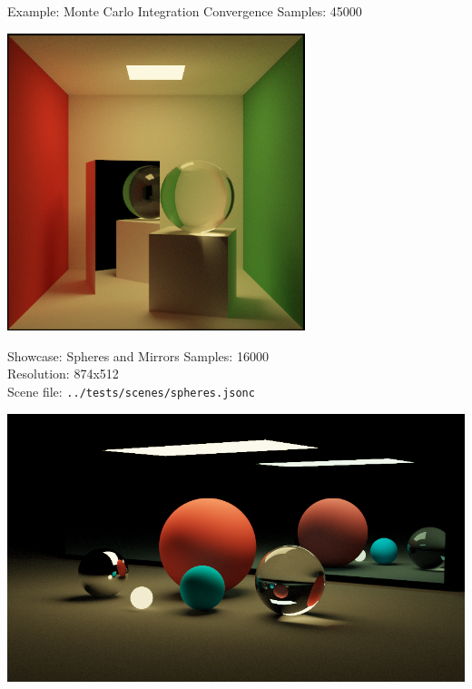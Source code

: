 \documentclass{beamer}
\begin{document}
\begin{frame}{Example: Monte Carlo Integration Convergence}
    Samples: 45000
    \begin{center}
        \includegraphics[width=0.65\textwidth]{../img/convergence/cornell-45000.png}
    \end{center}
\end{frame}

\begin{frame}{Showcase: Spheres and Mirrors}
    \footnotesize{
    Samples: 16000\\
    Resolution: 874x512\\
    Scene file: \texttt{../tests/scenes/spheres.jsonc}
    }
    \begin{center}
        \includegraphics[width=1.00\textwidth]{../img/spheres.png}
    \end{center}
\end{frame}
\end{document}
